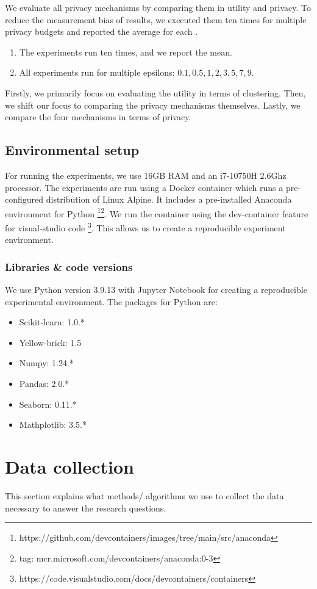 We evaluate all privacy mechanisms by comparing them in utility and privacy.
To reduce the measurement bias of results, we executed them ten times for multiple privacy budgets and reported the average for each \citep{9679364}.
\begin{enumerate}
  \item The experiments run ten times, and we report the mean.
  \item All experiments run for multiple epsilons: ${0.1, 0.5, 1, 2, 3, 5, 7, 9}$.
\end{enumerate}
Firstly, we primarily focus on evaluating the utility in terms of clustering.
Then, we shift our focus to comparing the privacy mechanisms themselves.
Lastly, we compare the four mechanisms in terms of privacy.

\subsection{Environmental setup}
For running the experiments, we use 16GB RAM and an i7-10750H 2.6Ghz processor.
The experiments are run using a Docker container which runs a pre-configured distribution of Linux Alpine.
It includes a pre-installed Anaconda environment for Python \footnote{https://github.com/devcontainers/images/tree/main/src/anaconda}\footnote{tag: mcr.microsoft.com/devcontainers/anaconda:0-3}.
We run the container using the dev-container feature for visual-studio code \footnote{https://code.visualstudio.com/docs/devcontainers/containers}.
This allows us to create a reproducible experiment environment.
\subsubsection{Libraries \& code versions}
We use Python version 3.9.13 with Jupyter Notebook for creating a reproducible experimental environment.
The packages for Python are:
\begin{itemize}
  \item Scikit-learn: 1.0.*
  \item Yellow-brick: 1.5
  \item Numpy: 1.24.*
  \item Pandas: 2.0.*
  \item Seaborn: 0.11.*
  \item Mathplotlib: 3.5.*
\end{itemize}

\section{Data collection}
This section explains what methods/ algorithms we use to collect the data necessary to answer the research questions.
